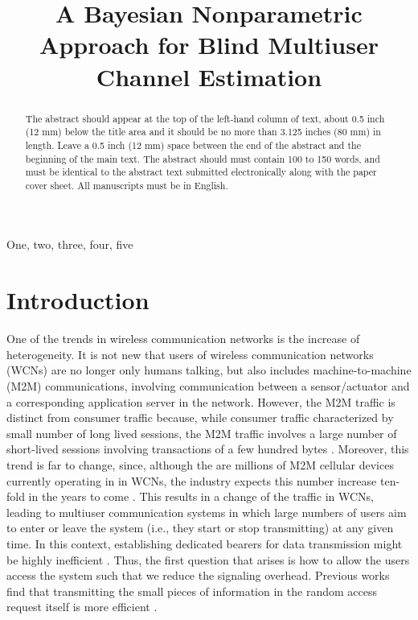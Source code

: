 \documentclass[a4paper]{article}
\title{A Bayesian Nonparametric Approach for Blind Multiuser Channel Estimation}
\begin{document}
%
\maketitle
%
\begin{abstract}
The abstract should appear at the top of the left-hand column of text, about
0.5 inch (12 mm) below the title area and it should be no more than 3.125 inches (80 mm) in
length.  Leave a 0.5 inch (12 mm) space between the end of the abstract and the
beginning of the main text.  The abstract should must contain 100 to 150
words, and must be identical to the abstract text submitted electronically
along with the paper cover sheet.  All manuscripts must be in English.
\end{abstract}
%
\begin{keywords}
One, two, three, four, five
\end{keywords}
%
\section{Introduction}
\label{sec:intro}

One of the trends in wireless communication networks is the increase of heterogeneity. It is not new that users of wireless communication networks (WCNs) are no longer only humans talking, but also includes machine-to-machine (M2M) communications, involving communication between a sensor/actuator and a corresponding application server in the network. However, the M2M traffic is distinct from
consumer traffic because, while consumer traffic characterized by small number of long lived sessions, the M2M traffic involves a large number of short-lived sessions involving transactions of a few hundred bytes  \cite{Dhillon2013}. Moreover, this trend is far to change, since, although the are millions of M2M cellular devices currently operating in in WCNs, the industry expects this number increase ten-fold in the years to come \cite{Dhillon2013}. 
%
This results in a change of the traffic in WCNs,  leading to multiuser communication systems in which large numbers of users aim to enter or leave  the system (i.e., they start or stop transmitting) at any given time. 
%
In this context,  establishing dedicated bearers for data transmission might be highly inefficient \cite{Dhillon2013}. Thus, the first question that arises is how to allow the users access the system such that we reduce the signaling overhead. Previous works find that transmitting the small pieces of information in the random access request itself is more efficient \cite{Chen2010}. 
\end{document}
